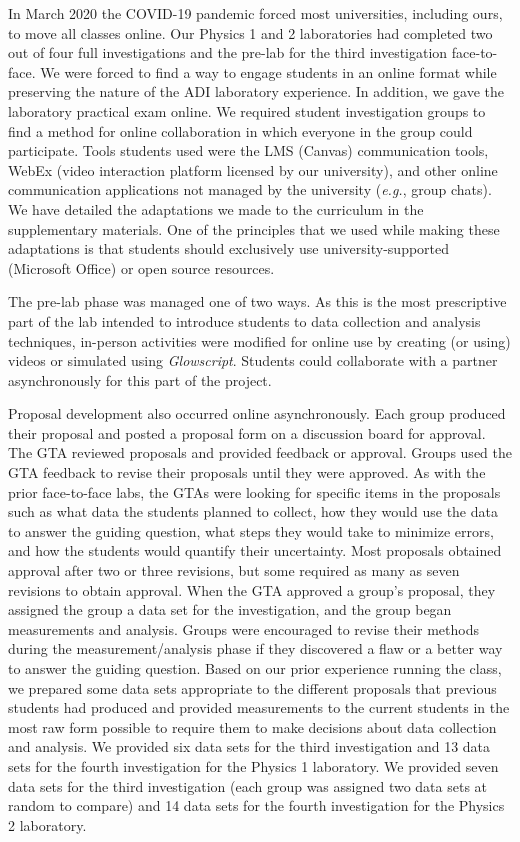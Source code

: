 \documentclass[aip, numerical, preprint]{revtex4-2}
\begin{document}
In March 2020 the COVID-19 pandemic forced most universities, including ours, to move all
classes online. Our Physics 1 and 2 laboratories had completed two out of
four full investigations and the pre-lab for the third investigation face-to-face. We were
forced to find a way to engage students in an online format while preserving the nature of the
ADI laboratory experience. In addition, we gave the laboratory practical exam online. We
required student investigation groups to find a method for online collaboration in which
everyone in the group could participate. Tools students used were the LMS (Canvas)
communication tools, WebEx (video interaction platform licensed by our university),
and other online communication applications not managed by the university (\emph{e.g.}, group
chats). We have detailed the adaptations we made to the curriculum in the supplementary
materials.  One of the principles that we used while making these adaptations is that students
should exclusively use university-supported (Microsoft Office) or open source resources.

The pre-lab phase was managed one of two ways.  As this is the most prescriptive part of the lab 
intended to introduce students to data collection and analysis techniques, in-person
activities were modified for online use by creating (or using) videos or simulated using
\emph{Glowscript}.\citep{glowscript} Students could collaborate with a partner asynchronously
for this part of the project.

Proposal development also occurred online asynchronously.  Each group produced their proposal
and posted a proposal form on a discussion board for approval. The GTA reviewed proposals and
provided feedback or approval. Groups used the GTA feedback to revise their proposals until
they were approved. As with the prior face-to-face labs, the GTAs were looking for specific items in 
the proposals such as what data the students planned to collect, how they would use the data to 
answer the guiding question, what steps they would take to minimize errors, and how the students 
would quantify their uncertainty. Most proposals obtained approval after two or three revisions, but 
some required as many as seven revisions to obtain approval. When the GTA approved a group's
proposal, they assigned the group a data set for the investigation, and the group began
measurements and analysis. Groups were encouraged to revise their methods during the  
measurement/analysis phase if they discovered a flaw or a better way to answer the guiding question. 
Based on our prior experience running the class, we prepared some
data sets appropriate to the different proposals that previous students had produced and
provided measurements to the current students in the most raw form possible to require them to
make decisions about data collection and analysis. We provided six data sets for the third investigation 
and 13 data sets for the fourth investigation for the Physics 1 laboratory. We provided seven data sets 
for the third investigation (each group was assigned two data sets at random to compare) and 14 data 
sets for the fourth investigation for the Physics 2 laboratory.
\end{document}
